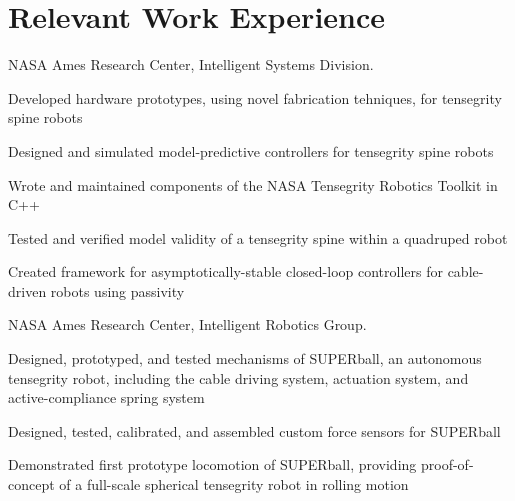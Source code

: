 \documentclass[letterpaper]{deedy-resume} %
\begin{document}
\section{Relevant Work Experience}

\vspace{0.2cm}


{{} NASA Ames Research Center, Intelligent Systems Division.

\begin{tightitemize}
\item Developed hardware prototypes, using novel fabrication tehniques, for tensegrity spine robots
\item Designed and simulated model-predictive controllers for tensegrity spine robots
\item Wrote and maintained components of the NASA Tensegrity Robotics Toolkit in C++
\item Tested and verified model validity of a tensegrity spine within a quadruped robot
\item Created framework for asymptotically-stable closed-loop controllers for cable-driven robots using passivity
\end{tightitemize}}

\vspace{0.2cm}


{{} NASA Ames Research Center, Intelligent Robotics Group.
  
\begin{tightitemize}
\item Designed, prototyped, and tested mechanisms of SUPERball, an autonomous tensegrity robot, including the cable driving system, actuation system, and active-compliance spring system
\item Designed, tested, calibrated, and assembled custom force sensors for SUPERball
\item Demonstrated first prototype locomotion of SUPERball, providing proof-of-concept of a full-scale spherical tensegrity robot in rolling motion
\end{tightitemize}}
\end{document}
